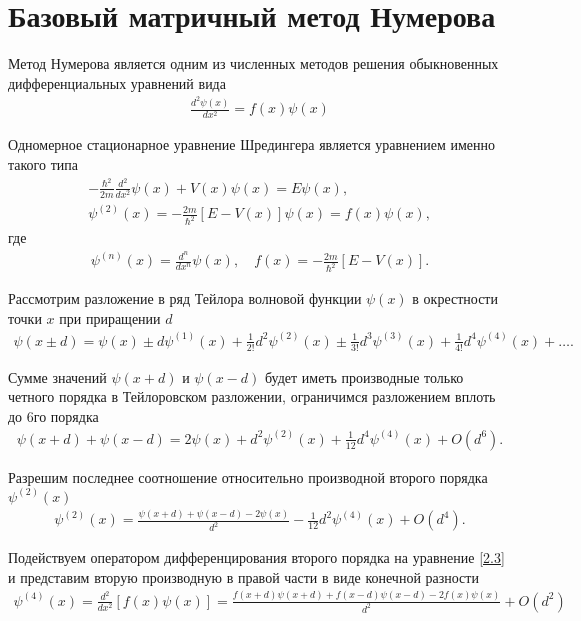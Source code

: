 \documentclass[14pt]{extarticle}
\newcommand{\lsq}{\left[}
\newcommand{\rsq}{\right]}
\newcommand{\psider}[1]{\psi^{(#1)}(x)}
\begin{document}
\section{Базовый матричный метод Нумерова}

Метод Нумерова является одним из численных методов решения обыкновенных дифференциальных уравнений вида
\begin{gather}
	\frac{d^2 \psi(x)}{d x^2} = f(x) \psi(x) \label{2.1}
\end{gather}

Одномерное стационарное уравнение Шредингера является уравнением именно такого типа
\begin{gather}
	- \frac{\hbar^2}{2m} \frac{d^2}{dx^2} \psi(x) + V(x) \psi(x) = E \psi(x), \label{2.2} \\
	\psi^{(2)}(x) = - \frac{2 m}{\hbar^2} \lsq E - V(x) \rsq \psi(x) = f(x) \psi(x), \label{2.3}
\end{gather}
где
\begin{gather}
	\psi^{(n)}(x) = \frac{d^n}{dx^n} \psi(x), \quad f(x) = -\frac{2m}{\hbar^2} \lsq E - V(x) \rsq. \label{2.3.1}
\end{gather}

Рассмотрим разложение в ряд Тейлора волновой функции $\psi(x)$ в окрестности точки $x$ при приращении $d$
\begin{gather}
	\psi(x \pm d) = \psi(x) \pm d \psider{1} + \frac{1}{2!} d^2 \psider{2} \pm \frac{1}{3!} d^3 \psider{3} + \frac{1}{4!} d^4 \psider{4} + \dots. \label{2.4}
\end{gather}

Сумме значений $\psi(x + d)$ и $\psi(x - d)$ будет иметь производные только четного порядка в Тейлоровском разложении, ограничимся разложением вплоть до 6го порядка
\begin{gather}
	\psi(x + d) + \psi(x - d) = 2 \psi(x) + d^2 \psider{2} + \frac{1}{12} d^4 \psider{4} + O(d^6). \label{2.5}
\end{gather}

Разрешим последнее соотношение относительно производной второго порядка $\psider{2}$
\begin{gather}
	\psider{2} = \frac{\psi(x + d) + \psi(x - d) - 2 \psi(x)}{d^2} - \frac{1}{12} d^2 \psider{4} + O(d^4). \label{2.6}
\end{gather}

Подействуем оператором дифференцирования второго порядка на уравнение \eqref{2.3} и представим вторую производную в правой части в виде конечной разности
\begin{gather}
	\psider{4} = \frac{d^2}{dx^2} \lsq f(x) \psi(x) \rsq = \frac{f(x + d) \psi(x + d) + f(x - d)\psi(x - d) - 2 f(x) \psi(x)}{d^2} + O(d^2) \label{2.7}
\end{gather}
\end{document}
